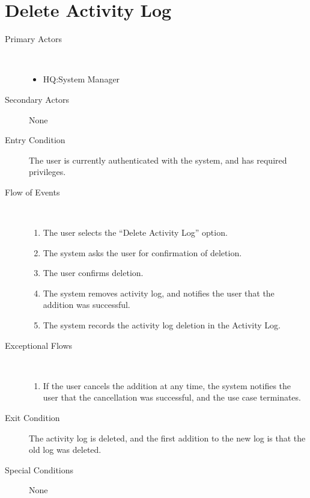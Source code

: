 \documentclass[a4paper,10pt]{report}
\begin{document}
\section{Delete Activity Log}
\begin{description}
\item[Primary Actors] \
  \begin{itemize}
  \item HQ:System Manager
  \end{itemize}
\item[Secondary Actors] None
\item[Entry Condition]
  The user is currently authenticated with the system, and has required privileges.
\item[Flow of Events] \
  \begin{enumerate}
  \item The user selects the ``Delete Activity Log'' option.
  \item The system asks the user for confirmation of deletion.
  \item The user confirms deletion.
  \item The system removes activity log, and notifies the user that the addition was successful.
  \item The system records the activity log deletion in the Activity Log.
  \end{enumerate}
\item[Exceptional Flows] \
  \begin{enumerate}
  \item If the user cancels the addition at any time, the system notifies the user that the cancellation was successful, and the use case terminates.
  \end{enumerate}
\item[Exit Condition]
  The activity log is deleted, and the first addition to the new log is that the old log was deleted.
\item[Special Conditions] None
\end{description}
\end{document}
